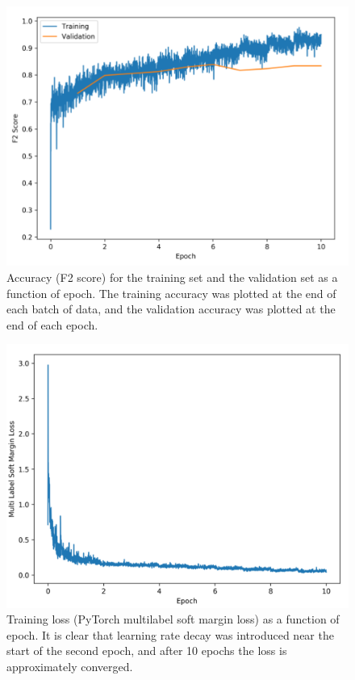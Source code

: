 \documentclass[10pt,twocolumn,letterpaper]{article}
\begin{document}
\begin{figure}
    \includegraphics[width=\columnwidth]{fig/AccuracyCurve.png}
    \caption{Accuracy (F2 score) for the training set and the validation set as a function of epoch. The training accuracy was plotted at the end of each batch of data, and the validation accuracy was plotted at the end of each epoch.}
    \label{fig:acc_6_layer}
\end{figure}

\begin{figure}
\includegraphics[width=\columnwidth]{fig/LossCurve.png}
    \caption{Training loss (PyTorch multilabel soft margin loss) as a function of epoch. It is clear that learning rate decay was introduced near the start of the second epoch, and after 10 epochs the loss is approximately converged.}
\end{figure}
\end{document}
